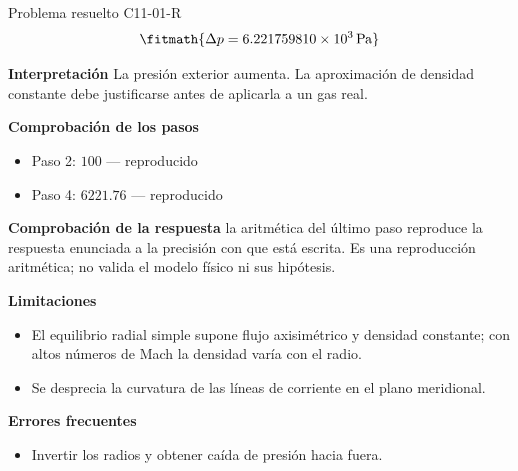\documentclass[10pt,openany]{book}
\begin{document}
\begin{studiumworked}{Problema resuelto C11-01-R}
\[
\fitmath{\Delta p=6.221759810\times10^{3}\,\mathrm{Pa}}
\]

\noindent\textbf{Interpretación}
La presión exterior aumenta. La aproximación de densidad constante debe justificarse antes de aplicarla a un gas real.

\noindent\textbf{Comprobación de los pasos}
\begin{itemize}
\item Paso 2: $100$ — reproducido
\item Paso 4: $6221.76$ — reproducido
\end{itemize}

\noindent\textbf{Comprobación de la respuesta} la aritmética del último paso reproduce la respuesta enunciada a la precisión con que está escrita. Es una reproducción aritmética; no valida el modelo físico ni sus hipótesis.

\noindent\textbf{Limitaciones}
\begin{itemize}
\item El equilibrio radial simple supone flujo axisimétrico y densidad constante; con altos números de Mach la densidad varía con el radio.
\item Se desprecia la curvatura de las líneas de corriente en el plano meridional.
\end{itemize}

\noindent\textbf{Errores frecuentes}
\begin{itemize}
\item Invertir los radios y obtener caída de presión hacia fuera.
\end{itemize}
\end{studiumworked}
\end{document}
